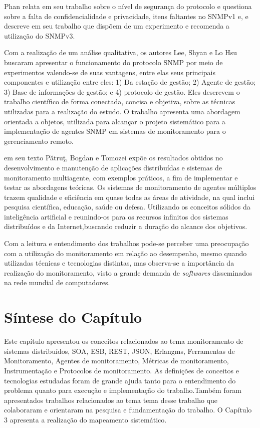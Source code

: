 Phan \cite{phan2009cryptanalysis} relata em seu trabalho sobre o nível de segurança do protocolo e questiona sobre a falta de confidencialidade e privacidade, itens faltantes no SNMPv1 e, e descreve em seu trabalho  que dispõem de um experimento e recomenda a utilização do SNMPv3.

Com a realização de um análise qualitativa, os autores Lee, Shyan e Lo Hsu \cite{lee2004design} buscaram apresentar o funcionamento do protocolo SNMP por meio de experimentos valendo-se de suas vantagens, entre elas seus principais componentes e utilização entre eles: 1) Da estação de gestão; 2) Agente de gestão; 3) Base de informações de gestão; e 4) protocolo de gestão. Eles descrevem o trabalho científico de forma conectada, concisa e objetiva, sobre as técnicas utilizadas para a realização do estudo. O trabalho apresenta uma abordagem orientada a objetos, utilizada para alcançar o projeto sistemático para a implementação de agentes SNMP em sistemas de monitoramento para o gerenciamento remoto.

em seu texto Pătruţ, Bogdan e Tomozei \cite{puatruct2010agent} expõe os resultados obtidos no desenvolvimento e manutenção de aplicações distribuídas e sistemas de monitoramento multiagente, com exemplos práticos, a fim de implementar e testar as abordagens teóricas. Os sistemas de monitoramento de agentes múltiplos trazem qualidade e eficiência em quase todas as áreas de atividade, na qual inclui pesquisa científica, educação, saúde ou defesa.
Utilizando os conceitos sólidos da inteligência artificial e reunindo-os para os recursos infinitos dos sistemas distribuídos e da Internet,buscando reduzir a duração do alcance dos objetivos.

Com a leitura e entendimento dos trabalhos pode-se perceber uma preocupação com a utilização do monitoramento em relação ao desempenho, mesmo quando utilizadas técnicas e tecnologias distintas, mas observa-se a importância da realização do monitoramento, visto a grande demanda de \textit{softwares} disseminados na rede mundial de computadores.


\section{Síntese do Capítulo}

Este capítulo apresentou os conceitos relacionados ao tema monitoramento de sistemas distribuídos, \acrshort{SOA}, \acrshort{ESB},  \acrshort{REST}, \acrshort{JSON}, Erlangms, Ferramentas de Monitoramento, Agentes de monitoramento, Métricas de monitoramento, Instrumentação e Protocolos de monitoramento. As definições de conceitos e tecnologias estudadas foram de grande ajuda tanto para o entendimento do problema quanto para execução e implementação do trabalho.Também foram apresentados trabalhos relacionados ao tema tema desse trabalho que colaboraram e orientaram na pesquisa e fundamentação do trabalho. O Capítulo 3 apresenta a realização do mapeamento sistemático.

